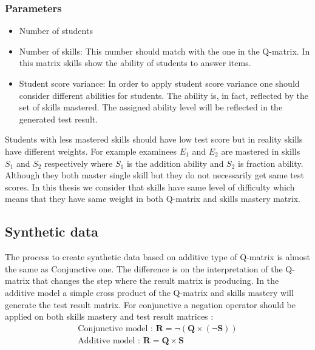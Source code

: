 \subsubsection{Parameters}
\begin{itemize}
\item Number of students 
\item Number of skills: This number should match with the one in the Q-matrix. In this matrix skills show the ability of students to answer items.
\item Student score variance:  In order to apply student score variance one should consider different abilities for students. The ability is, in fact, reflected by the set of skills mastered. The assigned ability level will be reflected in the generated test result.

\end{itemize}


Students with less mastered skills should have low test score but in reality skills have different weights. For example examinees $E_1$ and $E_2$ are mastered in skills $S_1$ and $S_2$ respectively where $S_1$ is the addition ability and $S_2$ is fraction ability. Although they both master single skill but they do not necessarily get same test scores. In this thesis we consider that skills have same level of difficulty which means that they have same weight in both Q-matrix and skills mastery matrix.

\subsection{Synthetic data}

The process to create synthetic data based on additive type of Q-matrix is almost the same as Conjunctive one. The difference is on the interpretation of the Q-matrix that changes the step where the result matrix is producing. In the additive model a simple cross product of the Q-matrix and skills mastery will generate the test result matrix. For conjunctive a negation operator should be applied on both skills mastery and test result matrices : 
\begin{equation}
\begin{array}{c}
\text{Conjunctive model :   } \mathbf{R}=\neg\left(\mathbf{Q}\times\left(\neg\mathbf{S}\right)\right)\\
\text{Additive model :   } \mathbf{R}=\mathbf{Q}\times\mathbf{S}
\end{array}
\label{NMF_GEN_EQ}
\end{equation}

